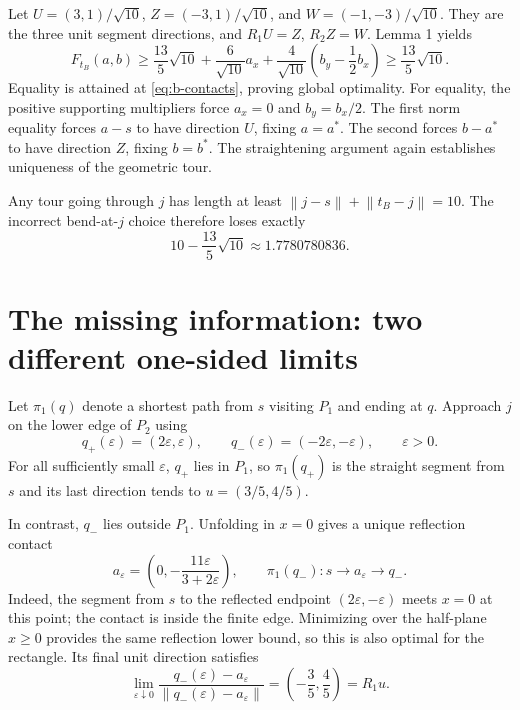 \documentclass[11pt,a4paper]{article}
\newcommand{\norm}[1]{\left\lVert#1\right\rVert}
\newcommand{\sect}[2]{\section{#1}\label{#2}}
\begin{document}
Let $U=(3,1)/\sqrt{10}$, $Z=(-3,1)/\sqrt{10}$, and
$W=(-1,-3)/\sqrt{10}$. They are the three unit segment directions, and
$R_1U=Z$, $R_2Z=W$. Lemma 1 yields
\begin{equation}
 F_{t_B}(a,b)\geq\frac{13}{5}\sqrt{10}
  +\frac6{\sqrt{10}}a_x
  +\frac4{\sqrt{10}}\left(b_y-\frac12b_x\right)
  \geq\frac{13}{5}\sqrt{10}.
 \label{eq:b-proof}
\end{equation}
Equality is attained at \eqref{eq:b-contacts}, proving global optimality.
For equality, the positive supporting multipliers force $a_x=0$ and $b_y=b_x/2$.
The first norm equality forces $a-s$ to have direction $U$, fixing
$a=a^*$. The second forces $b-a^*$ to have direction $Z$, fixing $b=b^*$.
The straightening argument again establishes uniqueness of the geometric tour.

Any tour going through $j$ has length at least
$\norm{j-s}+\norm{t_B-j}=10$. The incorrect bend-at-$j$ choice therefore loses
exactly
\[
 \boxed{10-\frac{13}{5}\sqrt{10}\approx1.7780780836}.
\]

\clearpage
\sect{The missing information: two different one-sided limits}{sec:limits}

Let $\pi_1(q)$ denote a shortest path from $s$ visiting $P_1$ and ending at $q$.
Approach $j$ on the lower edge of $P_2$ using
\[
 q_+(\varepsilon)=(2\varepsilon,\varepsilon),\qquad
 q_-(\varepsilon)=(-2\varepsilon,-\varepsilon),\qquad \varepsilon>0.
\]
For all sufficiently small $\varepsilon$, $q_+$ lies in $P_1$, so
$\pi_1(q_+)$ is the straight segment from $s$ and its last direction tends to
$u=(3/5,4/5)$.

In contrast, $q_-$ lies outside $P_1$. Unfolding in $x=0$ gives a unique
reflection contact
\begin{equation}
 a_\varepsilon=\left(0,-\frac{11\varepsilon}{3+2\varepsilon}\right),\qquad
 \pi_1(q_-):s\longrightarrow a_\varepsilon\longrightarrow q_-.
 \label{eq:epsilon-contact}
\end{equation}
Indeed, the segment from $s$ to the reflected endpoint $(2\varepsilon,-\varepsilon)$
meets $x=0$ at this point; the contact is inside the finite edge. Minimizing
over the half-plane $x\geq0$ provides the same reflection lower bound, so this
is also optimal for the rectangle. Its final unit direction satisfies
\begin{equation}
 \lim_{\varepsilon\downarrow0}
 \frac{q_-(\varepsilon)-a_\varepsilon}
      {\norm{q_-(\varepsilon)-a_\varepsilon}}
   =\left(-\frac35,\frac45\right)=R_1u.
 \label{eq:one-sided}
\end{equation}
\end{document}
